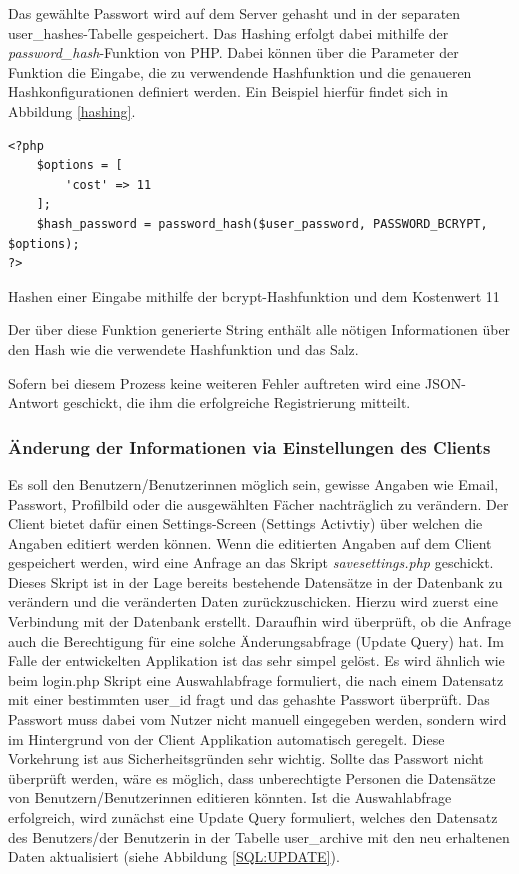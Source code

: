 \documentclass[../main.tex]{subfiles}
\begin{document}
	 Das gewählte Passwort wird auf dem Server gehasht und in der separaten user\_hashes-Tabelle gespeichert. Das Hashing erfolgt dabei mithilfe der \emph{password\_hash}-Funktion von PHP. Dabei können über die Parameter der Funktion die Eingabe, die zu verwendende Hashfunktion und die genaueren Hashkonfigurationen definiert werden. Ein Beispiel hierfür findet sich in Abbildung \ref{hashing}.
	 \begin{code}
	 	\begin{center}
	 		\begin{verbatim}
<?php
	$options = [
		'cost' => 11
	];
	$hash_password = password_hash($user_password, PASSWORD_BCRYPT, $options);
?>	
	 		\end{verbatim}
	 		\caption{Hashen einer Eingabe mithilfe der bcrypt-Hashfunktion und dem Kostenwert 11}\label{hashing}
	 	\end{center}
	 \end{code}	
	 Der über diese Funktion generierte String enthält alle nötigen Informationen über den Hash wie die verwendete Hashfunktion und das Salz.
	 
	 Sofern bei diesem Prozess keine weiteren Fehler auftreten wird eine JSON-Antwort geschickt, die ihm die erfolgreiche Registrierung mitteilt.
	 
	 \subsubsection{Änderung der Informationen via Einstellungen des Clients}
	 Es soll den Benutzern/Benutzerinnen möglich sein, gewisse Angaben wie Email, Passwort, Profilbild oder die ausgewählten Fächer nachträglich zu verändern. Der Client bietet dafür einen Settings-Screen (Settings Activtiy) über welchen die Angaben editiert werden können. Wenn die editierten Angaben auf dem Client gespeichert werden, wird eine Anfrage an das Skript \emph{savesettings.php} geschickt. Dieses Skript ist in der Lage bereits bestehende Datensätze in der Datenbank zu verändern und die veränderten Daten zurückzuschicken. Hierzu wird zuerst eine Verbindung mit der Datenbank erstellt. Daraufhin wird überprüft, ob die Anfrage auch die Berechtigung für eine solche Änderungsabfrage (Update Query) hat. Im Falle der entwickelten Applikation ist das sehr simpel gelöst. Es wird ähnlich wie beim login.php Skript eine Auswahlabfrage formuliert, die nach einem Datensatz mit einer bestimmten user\_id fragt und das gehashte Passwort überprüft. Das Passwort muss dabei vom Nutzer nicht manuell eingegeben werden, sondern wird im Hintergrund von der Client Applikation automatisch geregelt. Diese Vorkehrung ist aus Sicherheitsgründen sehr wichtig. Sollte das Passwort nicht überprüft werden, wäre es möglich, dass unberechtigte Personen die Datensätze von Benutzern/Benutzerinnen editieren könnten. Ist die Auswahlabfrage erfolgreich, wird zunächst eine Update Query formuliert, welches den Datensatz des Benutzers/der Benutzerin in der Tabelle user\_archive mit den neu erhaltenen Daten aktualisiert (siehe Abbildung \ref{SQL:UPDATE}).
	 
\end{document}
